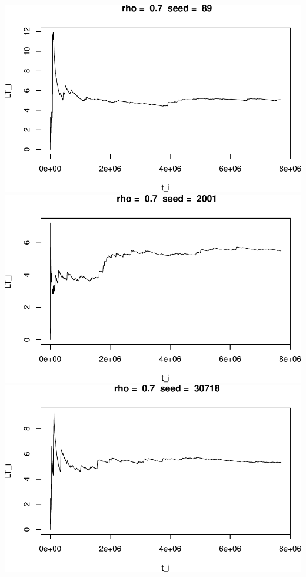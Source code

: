 \documentclass[]{article}
\begin{document}
\includegraphics{003_files/figure-latex/unnamed-chunk-16-7.pdf}
\includegraphics{003_files/figure-latex/unnamed-chunk-16-8.pdf}
\includegraphics{003_files/figure-latex/unnamed-chunk-16-9.pdf}
\end{document}
